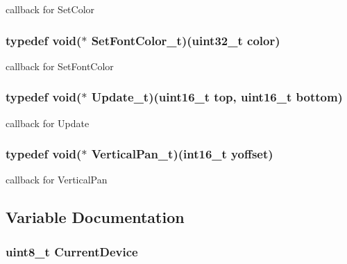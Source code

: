 callback for SetColor \hypertarget{group__graphic__hw__interface_g2720234f07ba67eb55362ad2b1b3d102}{
\subsubsection[{SetFontColor\_\-t}]{\setlength{\rightskip}{0pt plus 5cm}typedef void($\ast$ {\bf SetFontColor\_\-t})(uint32\_\-t color)}}
\label{group__graphic__hw__interface_g2720234f07ba67eb55362ad2b1b3d102}


callback for SetFontColor \hypertarget{group__graphic__hw__interface_gd6ccf1837a820c03c88a134373cba158}{
\subsubsection[{Update\_\-t}]{\setlength{\rightskip}{0pt plus 5cm}typedef void($\ast$ {\bf Update\_\-t})(uint16\_\-t top, uint16\_\-t bottom)}}
\label{group__graphic__hw__interface_gd6ccf1837a820c03c88a134373cba158}


callback for Update \hypertarget{group__graphic__hw__interface_g18b37a90b4b77654c4a5f7613868d4aa}{
\subsubsection[{VerticalPan\_\-t}]{\setlength{\rightskip}{0pt plus 5cm}typedef void($\ast$ {\bf VerticalPan\_\-t})(int16\_\-t yoffset)}}
\label{group__graphic__hw__interface_g18b37a90b4b77654c4a5f7613868d4aa}


callback for VerticalPan 

\subsection{Variable Documentation}
\hypertarget{group__graphic__hw__interface_g90833154adae4dc76085e743d7575b52}{
\subsubsection[{CurrentDevice}]{\setlength{\rightskip}{0pt plus 5cm}uint8\_\-t {\bf CurrentDevice}}}
\label{group__graphic__hw__interface_g90833154adae4dc76085e743d7575b52}


